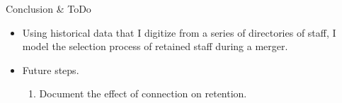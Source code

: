 \begin{frame}{Conclusion \& ToDo}
    \begin{itemize}
        \item Using historical data that I digitize from a series of directories of staff, I model the selection process of retained staff during a merger.

        \item Future steps.

        \begin{enumerate}
            \item Document the effect of connection on retention.
        \end{enumerate}
    \end{itemize}
\end{frame}